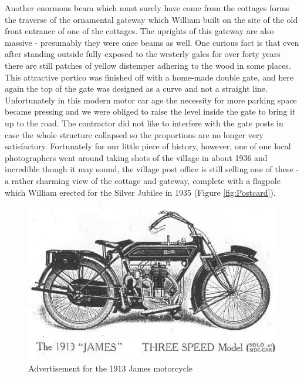 Another enormous beam which must surely have come from the cottages forms the traverse of the ornamental gateway which William built on the site of the old front entrance of one of the cottages. The uprights of this gateway are also massive - presumably they were once beams as well. One curious fact is that even after standing outside fully exposed to the westerly gales for over forty years there are still patches of yellow distemper adhering to the wood in some places. This attractive portico was finished off with a home-made double gate, and here again the top of the gate was designed as a curve and not a straight line. Unfortunately in this modern motor car age the necessity for more parking space became pressing and we were obliged to raise the level inside the gate to bring it up to the road. The contractor did not like to interfere with the gate posts in case the whole structure collapsed so the proportions are no longer very satisfactory. Fortunately for our little piece of history, however, one of one local photographers went around taking shots of the village in about 1936 and incredible though it may sound, the village post office is still selling one of these - a rather charming view of the cottage and gateway, complete with a flagpole which William erected for the Silver Jubilee in 1935 (Figure \ref{fig:Postcard}).

\begin{figure}[p]
	\centering
     \includegraphics[width=1\textwidth]{figures/James1913}
     \caption{Advertisement for the 1913 James motorcycle}
     \label{fig:James}
\end{figure}


